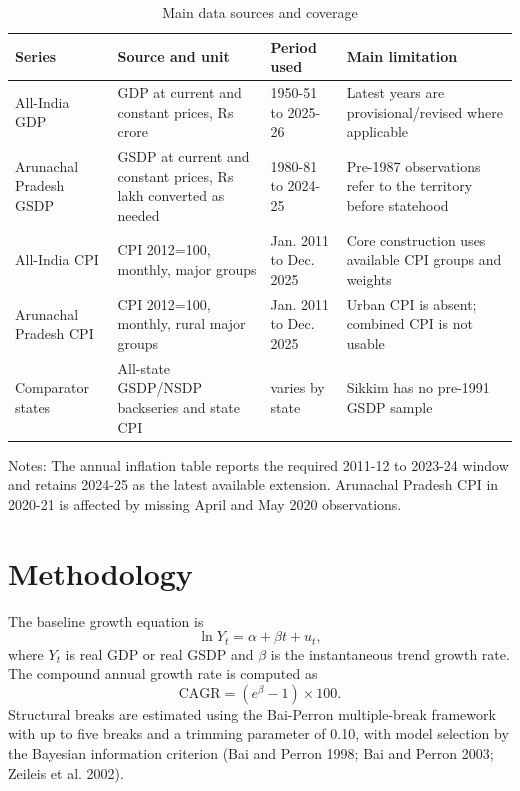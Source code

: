 \documentclass[11pt,a4paper]{article}
\begin{document}
\begin{table}[H]
\centering
\caption{Main data sources and coverage}
\label{tab:data-summary}
\begin{threeparttable}
\small
\begin{tabular}{L{2.8cm}L{4.7cm}L{2.8cm}L{2.9cm}}
\toprule
Series & Source and unit & Period used & Main limitation \\
\midrule
All-India GDP & GDP at current and constant prices, Rs crore & 1950-51 to 2025-26 & Latest years are provisional/revised where applicable \\
Arunachal Pradesh GSDP & GSDP at current and constant prices, Rs lakh converted as needed & 1980-81 to 2024-25 & Pre-1987 observations refer to the territory before statehood \\
All-India CPI & CPI 2012=100, monthly, major groups & Jan. 2011 to Dec. 2025 & Core construction uses available CPI groups and weights \\
Arunachal Pradesh CPI & CPI 2012=100, monthly, rural major groups & Jan. 2011 to Dec. 2025 & Urban CPI is absent; combined CPI is not usable \\
Comparator states & All-state GSDP/NSDP backseries and state CPI & varies by state & Sikkim has no pre-1991 GSDP sample \\
\bottomrule
\end{tabular}
\begin{tablenotes}
\footnotesize
\item Notes: The annual inflation table reports the required 2011-12 to 2023-24 window and retains 2024-25 as the latest available extension. Arunachal Pradesh CPI in 2020-21 is affected by missing April and May 2020 observations.
\end{tablenotes}
\end{threeparttable}
\end{table}

\section{Methodology}

The baseline growth equation is
\begin{equation}
\ln Y_t = \alpha + \beta t + u_t,
\end{equation}
where $Y_t$ is real GDP or real GSDP and $\beta$ is the instantaneous trend growth rate. The compound annual growth rate is computed as
\begin{equation}
\mathrm{CAGR} = \left(e^\beta - 1\right)\times 100.
\end{equation}
Structural breaks are estimated using the Bai-Perron multiple-break framework with up to five breaks and a trimming parameter of 0.10, with model selection by the Bayesian information criterion (Bai and Perron 1998; Bai and Perron 2003; Zeileis et al. 2002).
\end{document}
